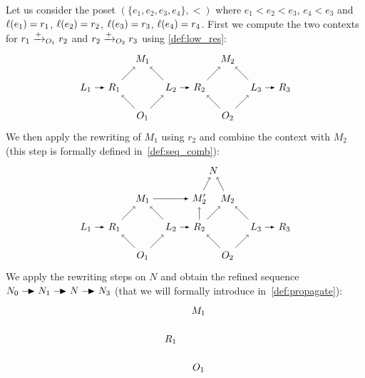 \begin{example}
\label{ex:e1e2e3}
Let us consider the poset $(\{e_1,e_2,e_3,e_4\},<)$ where $e_1<e_2<e_3$, $e_4<e_3$ and $\ell(e_1)=r_1$, $\ell(e_2)=r_2$, $\ell(e_3)=r_3$, $\ell(e_4)=r_4$. First we compute the two contexts for $r_1\mathrel{\xrightarrow{+}}_{O_1} r_2$ and $r_2\mathrel{\xrightarrow{+}}_{O_2} r_3$ using \autoref{def:low_res}:
\[
\begin{tikzpicture} %
  \node (o1) at (0,-1) {\(O_1\)};
  \node (m1) at (0,1) {\(M_1\)};
  \node (r1) at (-1,0) {\(R_1\)};
  \node (l1) at (-2,0) {\(L_1\)};
  \node (l2) at (1,0) {\(L_2\)};
  \node (r2) at (2,0) {\(R_2\)};
  \node (o2) at (3,-1) {\(O_2\)};
  \node (m2) at (3,1) {\(M_2\)};
  \node (l3) at (4,0) {\(L_3\)};
  \node (r3) at (5,0) {\(R_3\)};
  \draw [->] (o1) -- (r1);
  \draw [->] (o1) -- (l2);
  \draw [->] (r1) -- (m1);
  \draw [->] (l2) -- (m1);
  \draw [->] (o2) -- (r2);
  \draw [->] (o2) -- (l3);
  \draw [->] (r2) -- (m2);
  \draw [->] (l3) -- (m2);
  \draw [>=latex, ->] (l1) -- (r1);
  \draw [>=latex, ->] (l2) -- (r2);
  \draw [>=latex, ->] (l3) -- (r3);
\end{tikzpicture}
\]
We then apply the rewriting of $M_1$ using $r_2$ and combine the context with $M_2$ (this step is formally defined in~\autoref{def:seq_comb}):
\[
\begin{tikzpicture} %
  \node (o1) at (0,-1) {\(O_1\)};
  \node (m1) at (0,1) {\(M_1\)};
  \node (r1) at (-1,0) {\(R_1\)};
  \node (l1) at (-2,0) {\(L_1\)};
  \node (l2) at (1,0) {\(L_2\)};
  \node (r2) at (2,0) {\(R_2\)};
  \node (o2) at (3,-1) {\(O_2\)};
  \node (m2) at (3,1) {\(M_2\)};
  \node (l3) at (4,0) {\(L_3\)};
  \node (r3) at (5,0) {\(R_3\)};
  \node (m2p) at (2,1) {\(M_2'\)};
  \node (n) at (2.5,2) {\(N\)};
  \draw [->] (o1) -- (r1);
  \draw [->] (o1) -- (l2);
  \draw [->] (r1) -- (m1);
  \draw [->] (l2) -- (m1);
  \draw [->] (o2) -- (r2);
  \draw [->] (o2) -- (l3);
  \draw [->] (r2) -- (m2);
  \draw [->] (l3) -- (m2);
  \draw [->] (m2) -- (n);
  \draw [->] (m2p) -- (n);
  \draw [->] (r2) -- (m2p);
  \draw [>=latex, ->] (l1) -- (r1);
  \draw [>=latex, ->] (l2) -- (r2);
  \draw [>=latex, ->] (l3) -- (r3);
  \draw [>=latex, ->] (m1) -- (m2p);
\end{tikzpicture}
\]
We apply the rewriting steps on $N$ and obtain the refined sequence $N_0\action N_1\action N\action N_3$ (that we will formally introduce in~\autoref{def:propagate}):
\[
\begin{tikzpicture} %
  \node (o1) at (0,-1) {\(O_1\)};
  \node (m1) at (0,1) {\(M_1\)};
  \node (r1) at (-1,0) {\(R_1\)};

\end{tikzpicture}\]
\end{example}
